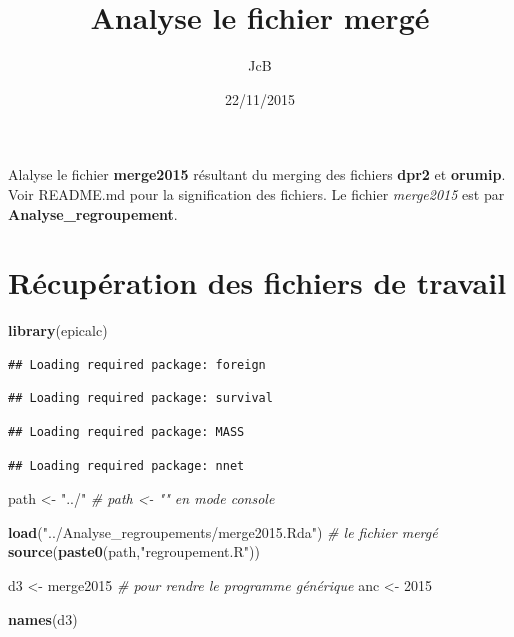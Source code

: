 \documentclass[]{article}
\title{Analyse le fichier mergé}
\author{JcB}
\date{22/11/2015}
\newenvironment{Shaded}{\begin{snugshade}}{\end{snugshade}}
\newcommand{\KeywordTok}[1]{\textcolor[rgb]{0.13,0.29,0.53}{\textbf{{#1}}}}
\newcommand{\DecValTok}[1]{\textcolor[rgb]{0.00,0.00,0.81}{{#1}}}
\newcommand{\StringTok}[1]{\textcolor[rgb]{0.31,0.60,0.02}{{#1}}}
\newcommand{\CommentTok}[1]{\textcolor[rgb]{0.56,0.35,0.01}{\textit{{#1}}}}
\newcommand{\NormalTok}[1]{{#1}}
\begin{document}
\maketitle


{
\hypersetup{linkcolor=black}
\setcounter{tocdepth}{2}
\tableofcontents
}
Alalyse le fichier \textbf{merge2015} résultant du merging des fichiers
\textbf{dpr2} et \textbf{orumip}. Voir README.md pour la signification
des fichiers. Le fichier \emph{merge2015} est par
\textbf{Analyse\_regroupement}.

\section{Récupération des fichiers de
travail}\label{recuperation-des-fichiers-de-travail}

\begin{Shaded}
\begin{Highlighting}[]
\KeywordTok{library}\NormalTok{(epicalc)}
\end{Highlighting}
\end{Shaded}

\begin{verbatim}
## Loading required package: foreign
\end{verbatim}

\begin{verbatim}
## Loading required package: survival
\end{verbatim}

\begin{verbatim}
## Loading required package: MASS
\end{verbatim}

\begin{verbatim}
## Loading required package: nnet
\end{verbatim}

\begin{Shaded}
\begin{Highlighting}[]
\NormalTok{path <-}\StringTok{ "../"} \CommentTok{# path <- "" en mode console}

\KeywordTok{load}\NormalTok{(}\StringTok{"../Analyse_regroupements/merge2015.Rda"}\NormalTok{) }\CommentTok{# le fichier mergé}
\KeywordTok{source}\NormalTok{(}\KeywordTok{paste0}\NormalTok{(path,}\StringTok{"regroupement.R"}\NormalTok{))}

\NormalTok{d3 <-}\StringTok{ }\NormalTok{merge2015 }\CommentTok{# pour rendre le programme générique}
\NormalTok{anc <-}\StringTok{ }\DecValTok{2015}

\KeywordTok{names}\NormalTok{(d3)}
\end{Highlighting}
\end{Shaded}
\end{document}
